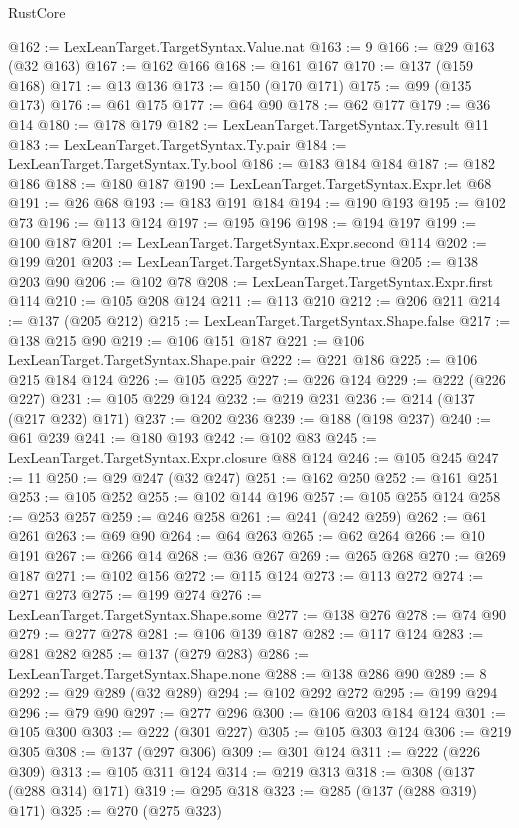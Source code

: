 \begin{lexlean}{RustCore}
\begin{coremodule}
{\begin{coremodule}
{{{{{{{{{{{{{{{{{{{{{{{{{{{{{{{{{{{{{{{{{{{{@162 := LexLeanTarget.TargetSyntax.Value.nat
@163 := 9
@166 := @29 @163 (@32 @163)
@167 := @162 @166
@168 := @161 @167
@170 := @137 (@159 @168)
@171 := @13 @136
@173 := @150 (@170 @171)
@175 := @99 (@135 @173)
@176 := @61 @175
@177 := @64 @90
@178 := @62 @177
@179 := @36 @14
@180 := @178 @179
@182 := LexLeanTarget.TargetSyntax.Ty.result @11
@183 := LexLeanTarget.TargetSyntax.Ty.pair
@184 := LexLeanTarget.TargetSyntax.Ty.bool
@186 := @183 @184 @184
@187 := @182 @186
@188 := @180 @187
@190 := LexLeanTarget.TargetSyntax.Expr.let @68
@191 := @26 @68
@193 := @183 @191 @184
@194 := @190 @193
@195 := @102 @73
@196 := @113 @124
@197 := @195 @196
@198 := @194 @197
@199 := @100 @187
@201 := LexLeanTarget.TargetSyntax.Expr.second @114
@202 := @199 @201
@203 := LexLeanTarget.TargetSyntax.Shape.true
@205 := @138 @203 @90
@206 := @102 @78
@208 := LexLeanTarget.TargetSyntax.Expr.first @114
@210 := @105 @208 @124
@211 := @113 @210
@212 := @206 @211
@214 := @137 (@205 @212)
@215 := LexLeanTarget.TargetSyntax.Shape.false
@217 := @138 @215 @90
@219 := @106 @151 @187
@221 := @106 LexLeanTarget.TargetSyntax.Shape.pair
@222 := @221 @186
@225 := @106 @215 @184 @124
@226 := @105 @225
@227 := @226 @124
@229 := @222 (@226 @227)
@231 := @105 @229 @124
@232 := @219 @231
@236 := @214 (@137 (@217 @232) @171)
@237 := @202 @236
@239 := @188 (@198 @237)
@240 := @61 @239
@241 := @180 @193
@242 := @102 @83
@245 := LexLeanTarget.TargetSyntax.Expr.closure @88 @124
@246 := @105 @245
@247 := 11
@250 := @29 @247 (@32 @247)
@251 := @162 @250
@252 := @161 @251
@253 := @105 @252
@255 := @102 @144 @196
@257 := @105 @255 @124
@258 := @253 @257
@259 := @246 @258
@261 := @241 (@242 @259)
@262 := @61 @261
@263 := @69 @90
@264 := @64 @263
@265 := @62 @264
@266 := @10 @191
@267 := @266 @14
@268 := @36 @267
@269 := @265 @268
@270 := @269 @187
@271 := @102 @156
@272 := @115 @124
@273 := @113 @272
@274 := @271 @273
@275 := @199 @274
@276 := LexLeanTarget.TargetSyntax.Shape.some
@277 := @138 @276
@278 := @74 @90
@279 := @277 @278
@281 := @106 @139 @187
@282 := @117 @124
@283 := @281 @282
@285 := @137 (@279 @283)
@286 := LexLeanTarget.TargetSyntax.Shape.none
@288 := @138 @286 @90
@289 := 8
@292 := @29 @289 (@32 @289)
@294 := @102 @292 @272
@295 := @199 @294
@296 := @79 @90
@297 := @277 @296
@300 := @106 @203 @184 @124
@301 := @105 @300
@303 := @222 (@301 @227)
@305 := @105 @303 @124
@306 := @219 @305
@308 := @137 (@297 @306)
@309 := @301 @124
@311 := @222 (@226 @309)
@313 := @105 @311 @124
@314 := @219 @313
@318 := @308 (@137 (@288 @314) @171)
@319 := @295 @318
@323 := @285 (@137 (@288 @319) @171)
@325 := @270 (@275 @323)
}}}}}}}}}}}}}}}}}}}}}}}}}}}}}}}}}}}}}}}}}}}}
\end{coremodule}}
\end{coremodule}
\end{lexlean}
